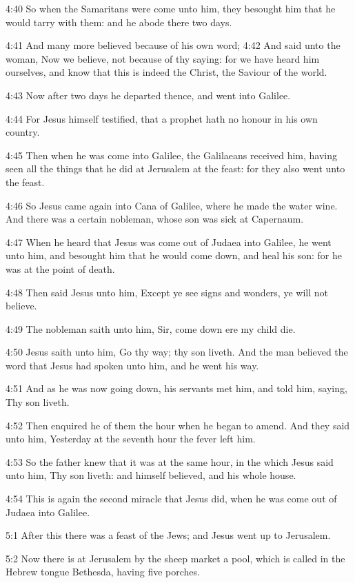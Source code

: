 4:40 So when the Samaritans were come unto him, they besought him that
he would tarry with them: and he abode there two days.

4:41 And many more believed because of his own word; 4:42 And said
unto the woman, Now we believe, not because of thy saying: for we have
heard him ourselves, and know that this is indeed the Christ, the
Saviour of the world.

4:43 Now after two days he departed thence, and went into Galilee.

4:44 For Jesus himself testified, that a prophet hath no honour in his
own country.

4:45 Then when he was come into Galilee, the Galilaeans received him,
having seen all the things that he did at Jerusalem at the feast: for
they also went unto the feast.

4:46 So Jesus came again into Cana of Galilee, where he made the water
wine. And there was a certain nobleman, whose son was sick at
Capernaum.

4:47 When he heard that Jesus was come out of Judaea into Galilee, he
went unto him, and besought him that he would come down, and heal his
son: for he was at the point of death.

4:48 Then said Jesus unto him, Except ye see signs and wonders, ye
will not believe.

4:49 The nobleman saith unto him, Sir, come down ere my child die.

4:50 Jesus saith unto him, Go thy way; thy son liveth. And the man
believed the word that Jesus had spoken unto him, and he went his way.

4:51 And as he was now going down, his servants met him, and told him,
saying, Thy son liveth.

4:52 Then enquired he of them the hour when he began to amend. And
they said unto him, Yesterday at the seventh hour the fever left him.

4:53 So the father knew that it was at the same hour, in the which
Jesus said unto him, Thy son liveth: and himself believed, and his
whole house.

4:54 This is again the second miracle that Jesus did, when he was come
out of Judaea into Galilee.

5:1 After this there was a feast of the Jews; and Jesus went up to
Jerusalem.

5:2 Now there is at Jerusalem by the sheep market a pool, which is
called in the Hebrew tongue Bethesda, having five porches.

